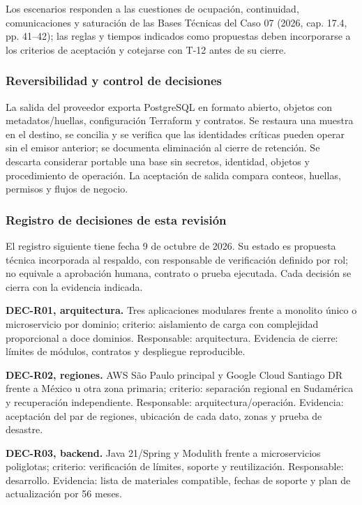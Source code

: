 \documentclass[11pt,letterpaper]{report}
\begin{document}
Los escenarios responden a las cuestiones de ocupación, continuidad, comunicaciones y saturación de las Bases Técnicas del Caso 07 (2026, cap. 17.4, pp. 41--42); las reglas y tiempos indicados como propuestas deben incorporarse a los criterios de aceptación y cotejarse con T-12 antes de su cierre.

\subsubsection*{Reversibilidad y control de decisiones}

La salida del proveedor exporta PostgreSQL en formato abierto, objetos con metadatos/huellas, configuración Terraform y contratos. Se restaura una muestra en el destino, se concilia y se verifica que las identidades críticas pueden operar sin el emisor anterior; se documenta eliminación al cierre de retención. Se descarta considerar portable una base sin secretos, identidad, objetos y procedimiento de operación. La aceptación de salida compara conteos, huellas, permisos y flujos de negocio.

\subsubsection*{Registro de decisiones de esta revisión}

El registro siguiente tiene fecha 9 de octubre de 2026. Su estado es propuesta técnica incorporada al respaldo, con responsable de verificación definido por rol; no equivale a aprobación humana, contrato o prueba ejecutada. Cada decisión se cierra con la evidencia indicada.

\textbf{DEC-R01, arquitectura.} Tres aplicaciones modulares frente a monolito único o microservicio por dominio; criterio: aislamiento de carga con complejidad proporcional a doce dominios. Responsable: arquitectura. Evidencia de cierre: límites de módulos, contratos y despliegue reproducible.

\textbf{DEC-R02, regiones.} AWS São Paulo principal y Google Cloud Santiago DR frente a México u otra zona primaria; criterio: separación regional en Sudamérica y recuperación independiente. Responsable: arquitectura/operación. Evidencia: aceptación del par de regiones, ubicación de cada dato, zonas y prueba de desastre.

\textbf{DEC-R03, backend.} Java 21/Spring y Modulith frente a microservicios poliglotas; criterio: verificación de límites, soporte y reutilización. Responsable: desarrollo. Evidencia: lista de materiales compatible, fechas de soporte y plan de actualización por 56 meses.
\end{document}
